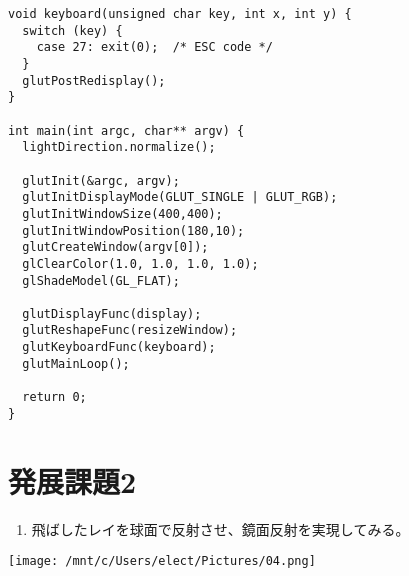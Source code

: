 \documentclass{scrartcl}
\begin{document}
\begin{verbatim}
void keyboard(unsigned char key, int x, int y) {
  switch (key) {
    case 27: exit(0);  /* ESC code */
  }
  glutPostRedisplay();
}

int main(int argc, char** argv) {
  lightDirection.normalize();

  glutInit(&argc, argv);
  glutInitDisplayMode(GLUT_SINGLE | GLUT_RGB);
  glutInitWindowSize(400,400);
  glutInitWindowPosition(180,10);
  glutCreateWindow(argv[0]);
  glClearColor(1.0, 1.0, 1.0, 1.0);
  glShadeModel(GL_FLAT);

  glutDisplayFunc(display);
  glutReshapeFunc(resizeWindow);
  glutKeyboardFunc(keyboard);
  glutMainLoop();

  return 0;
}
\end{verbatim}

\section{発展課題2}
\label{sec:org88f2767}
\begin{enumerate}
\item 飛ばしたレイを球面で反射させ、鏡面反射を実現してみる。\\
\end{enumerate}

\begin{center}
\texttt{[image: /mnt/c/Users/elect/Pictures/04.png]}
\end{center}
\end{document}
